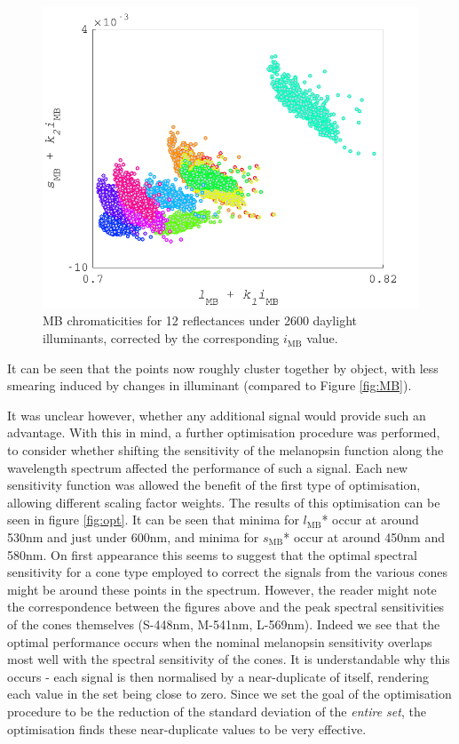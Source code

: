 \begin{figure}[htbp]
    \includegraphics[max width=\textwidth]{figs/comp/melcomp_1/correctedChromaticities.pdf}
    \caption{\gls{MB} chromaticities for 12 reflectances under 2600 daylight illuminants, corrected by the corresponding $i_{\text{MB}}$ value.}
    \label{fig:corrected}
\end{figure} 

It can be seen that the points now roughly cluster together by object, with less smearing induced by changes in illuminant (compared to Figure \ref{fig:MB}).

It was unclear however, whether any additional signal would provide such an advantage. With this in mind, a further optimisation procedure was performed, to consider whether shifting the sensitivity of the melanopsin function along the wavelength spectrum affected the performance of such a signal. Each new sensitivity function was allowed the benefit of the first type of optimisation, allowing different scaling factor weights. The results of this optimisation can be seen in figure \ref{fig:opt}. It can be seen that minima for $l_{\text{MB}}$* occur at around 530nm and just under 600nm, and minima for $s_{\text{MB}}$* occur at around 450nm and 580nm. On first appearance this seems to suggest that the optimal spectral sensitivity for a cone type employed to correct the signals from the various cones might be around these points in the spectrum. However, the reader might note the correspondence between the figures above and the peak spectral sensitivities of the cones themselves (S-448nm, M-541nm, L-569nm). Indeed we see that the optimal performance occurs when the nominal melanopsin sensitivity overlaps most well with the spectral sensitivity of the cones. It is understandable why this occurs - each signal is then normalised by a near-duplicate of itself, rendering each value in the set being close to zero. Since we set the goal of the optimisation procedure to be the reduction of the standard deviation of the \emph{entire set}, the optimisation finds these near-duplicate values to be very effective.

